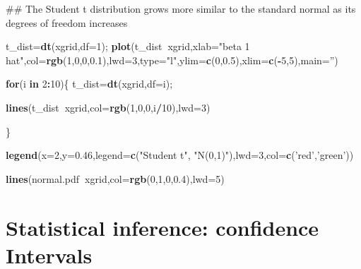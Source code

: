 \documentclass[12pt,]{book}
\newenvironment{Shaded}{\begin{snugshade}}{\end{snugshade}}
\newcommand{\KeywordTok}[1]{\textcolor[rgb]{0.13,0.29,0.53}{\textbf{#1}}}
\newcommand{\DataTypeTok}[1]{\textcolor[rgb]{0.13,0.29,0.53}{#1}}
\newcommand{\DecValTok}[1]{\textcolor[rgb]{0.00,0.00,0.81}{#1}}
\newcommand{\FloatTok}[1]{\textcolor[rgb]{0.00,0.00,0.81}{#1}}
\newcommand{\StringTok}[1]{\textcolor[rgb]{0.31,0.60,0.02}{#1}}
\newcommand{\ControlFlowTok}[1]{\textcolor[rgb]{0.13,0.29,0.53}{\textbf{#1}}}
\newcommand{\OperatorTok}[1]{\textcolor[rgb]{0.81,0.36,0.00}{\textbf{#1}}}
\newcommand{\NormalTok}[1]{#1}
\begin{document}
\begin{Shaded}
\begin{Highlighting}[]
\NormalTok{## The Student t distribution grows more similar to the standard normal as its degrees of freedom increases }

\NormalTok{t_dist=}\KeywordTok{dt}\NormalTok{(xgrid,}\DataTypeTok{df=}\DecValTok{1}\NormalTok{);}
\KeywordTok{plot}\NormalTok{(t_dist}\OperatorTok{~}\NormalTok{xgrid,}\DataTypeTok{xlab=}\StringTok{"beta 1 hat"}\NormalTok{,}\DataTypeTok{col=}\KeywordTok{rgb}\NormalTok{(}\DecValTok{1}\NormalTok{,}\DecValTok{0}\NormalTok{,}\DecValTok{0}\NormalTok{,}\FloatTok{0.1}\NormalTok{),}\DataTypeTok{lwd=}\DecValTok{3}\NormalTok{,}\DataTypeTok{type=}\StringTok{"l"}\NormalTok{,}\DataTypeTok{ylim=}\KeywordTok{c}\NormalTok{(}\DecValTok{0}\NormalTok{,}\FloatTok{0.5}\NormalTok{),}\DataTypeTok{xlim=}\KeywordTok{c}\NormalTok{(}\OperatorTok{-}\DecValTok{5}\NormalTok{,}\DecValTok{5}\NormalTok{),}\DataTypeTok{main=}\StringTok{''}\NormalTok{)}

\ControlFlowTok{for}\NormalTok{(i }\ControlFlowTok{in} \DecValTok{2}\OperatorTok{:}\DecValTok{10}\NormalTok{)\{}
\NormalTok{t_dist=}\KeywordTok{dt}\NormalTok{(xgrid,}\DataTypeTok{df=}\NormalTok{i);}

\KeywordTok{lines}\NormalTok{(t_dist}\OperatorTok{~}\NormalTok{xgrid,}\DataTypeTok{col=}\KeywordTok{rgb}\NormalTok{(}\DecValTok{1}\NormalTok{,}\DecValTok{0}\NormalTok{,}\DecValTok{0}\NormalTok{,i}\OperatorTok{/}\DecValTok{10}\NormalTok{),}\DataTypeTok{lwd=}\DecValTok{3}\NormalTok{)}

\NormalTok{\}}

\KeywordTok{legend}\NormalTok{(}\DataTypeTok{x=}\DecValTok{2}\NormalTok{,}\DataTypeTok{y=}\FloatTok{0.46}\NormalTok{,}\DataTypeTok{legend=}\KeywordTok{c}\NormalTok{(}\StringTok{"Student t"}\NormalTok{, }\StringTok{"N(0,1)"}\NormalTok{),}\DataTypeTok{lwd=}\DecValTok{3}\NormalTok{,}\DataTypeTok{col=}\KeywordTok{c}\NormalTok{(}\StringTok{'red'}\NormalTok{,}\StringTok{'green'}\NormalTok{))}

\KeywordTok{lines}\NormalTok{(normal.pdf}\OperatorTok{~}\NormalTok{xgrid,}\DataTypeTok{col=}\KeywordTok{rgb}\NormalTok{(}\DecValTok{0}\NormalTok{,}\DecValTok{1}\NormalTok{,}\DecValTok{0}\NormalTok{,}\FloatTok{0.4}\NormalTok{),}\DataTypeTok{lwd=}\DecValTok{5}\NormalTok{)}
\end{Highlighting}
\end{Shaded}

\chapter{Statistical inference: confidence Intervals}\label{ch:CI}
\end{document}
